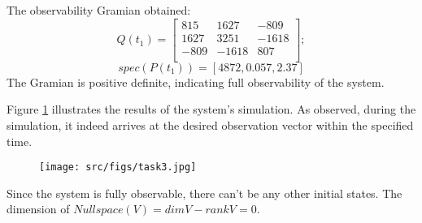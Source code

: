 The observability Gramian obtained:
\[
        Q(t_1) = \begin{bmatrix}
        815 & 1627 & -809\\
        1627 & 3251 & -1618 \\
        -809 & -1618 & 807 \\
        \end{bmatrix};
\]
\[
        spec(P(t_1)) = [4872, 0.057, 2.37]
\]The Gramian is positive definite, indicating full observability of the system.

Figure \ref{fig:task3} illustrates the results of the system's simulation. As observed, during the simulation, it indeed arrives at the desired observation vector within the specified time.
\begin{figure}[ht!]
        \centering
        \texttt{[image: src/figs/task3.jpg]}
        \label{fig:task3}
\end{figure}
Since the system is fully observable, there can't be any other initial states. The dimension of \(Nullspace(V) = dimV - rankV = 0\).
